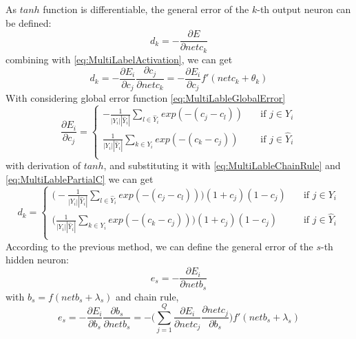 As $tanh$ function is differentiable, the general error of the $k$-th output neuron can be defined:
\begin{equation}\label{eq:MultiLableErrorDif}
d_{k} = -\frac{\partial E}{\partial netc_{k}}
\end{equation}
combining with \ref{eq:MultiLabelActivation}, we can get
\begin{equation}\label{eq:MultiLableChainRule}
d_{k} = -\frac{\partial E_{i}}{\partial c_{j}} \frac{\partial c_{j}}{\partial netc_{k}} = - \frac{\partial E_{i}}{\partial c_{j}} f'(netc_{k} + \theta_{k})
\end{equation}
With considering global error function \ref{eq:MultiLableGlobalError}
\begin{equation}\label{eq:MultiLablePartialC}
\frac{\partial E_{i}}{\partial c_{j}}= 
\begin{cases}
    -\frac{1}{|Y_{i}||\hat{Y}_{i}|} \sum_{l \in \hat{Y}_{i}} exp(-(c_{j} - c_{l}))       & \quad \text{if } j \in Y_{i}\\
    \frac{1}{|Y_{i}||\hat{Y}_{i}|} \sum_{k \in Y_{i}} exp(-(c_{k} - c_{j}))       & \quad \text{if } j \in \hat{Y}_{i}\\
  \end{cases}
\end{equation}
with derivation of $tanh$, and substituting it with \ref{eq:MultiLableChainRule} and \ref{eq:MultiLablePartialC} we can get
\begin{equation}\label{eq:MultiLableGenErr}
d_{k}= 
\begin{cases}
    \big(-\frac{1}{|Y_{i}||\hat{Y}_{i}|} \sum_{l \in \hat{Y}_{i}} exp(-(c_{j} - c_{l}))\big)(1+c_{j})(1-c_{j})       & \quad \text{if } j \in Y_{i}\\
    \big(\frac{1}{|Y_{i}||\hat{Y}_{i}|} \sum_{k \in Y_{i}} exp(-(c_{k} - c_{j}))\big)(1+c_{j})(1-c_{j})       & \quad \text{if } j \in \hat{Y}_{i}\\
  \end{cases}
\end{equation}
According to the previous method, we can define the general error of the $s$-th hidden neuron:
\begin{equation}\label{eq:MultiLableGenErrS}
e_{s} = - \frac{\partial E_{i}}{\partial netb_{s}}
\end{equation}
with $b_{s} = f(netb_{s} + \lambda_{s})$ and chain rule,
\begin{equation}\label{eq:MultiLablePartialE}
e_{s} = - \frac{\partial E_{i}}{\partial b_{s}} \frac{\partial b_{s}}{\partial netb_{s}} = - \big( \sum_{j=1}^Q \frac{\partial E_{i}}{\partial netc_{j}} \frac{\partial netc_{j}}{\partial b_{s}}\big)f'(netb_{s} + \lambda_{s})
\end{equation}
